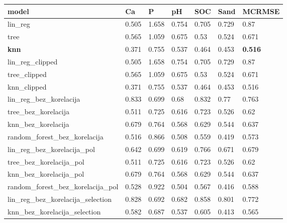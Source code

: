 \documentclass[12pt]{article}
\begin{document}
\begin{table}[!ht]
    \centering
    \begin{tabular}{|l|l|l|l|l|l|l|}
    \hline
        model & Ca & P & pH & SOC & Sand & MCRMSE \\ \hline
        lin\_reg & 0.505 & 1.658 & 0.754 & 0.705 & 0.729 & 0.87 \\ \hline
        tree & 0.565 & 1.059 & 0.675 & 0.53 & 0.524 & 0.671 \\ \hline
		\textbf{knn} & 0.371 & 0.755 & 0.537 & 0.464 & 0.453 & \textbf{0.516} \\ \hline
        lin\_reg\_clipped & 0.505 & 1.658 & 0.754 & 0.705 & 0.729 & 0.87 \\ \hline
        tree\_clipped & 0.565 & 1.059 & 0.675 & 0.53 & 0.524 & 0.671 \\ \hline
        knn\_clipped & 0.371 & 0.755 & 0.537 & 0.464 & 0.453 & 0.516 \\ \hline
        lin\_reg\_bez\_korelacija & 0.833 & 0.699 & 0.68 & 0.832 & 0.77 & 0.763 \\ \hline
        tree\_bez\_korelacija & 0.511 & 0.725 & 0.616 & 0.723 & 0.526 & 0.62 \\ \hline
        knn\_bez\_korelacija & 0.679 & 0.764 & 0.568 & 0.629 & 0.544 & 0.637 \\ \hline
        random\_forest\_bez\_korelacija & 0.516 & 0.866 & 0.508 & 0.559 & 0.419 & 0.573 \\ \hline
        lin\_reg\_bez\_korelacija\_pol & 0.642 & 0.699 & 0.619 & 0.766 & 0.671 & 0.679 \\ \hline
        tree\_bez\_korelacija\_pol & 0.511 & 0.725 & 0.616 & 0.723 & 0.526 & 0.62 \\ \hline
        knn\_bez\_korelacija\_pol & 0.679 & 0.764 & 0.568 & 0.629 & 0.544 & 0.637 \\ \hline
        random\_forest\_bez\_korelacija\_pol & 0.528 & 0.922 & 0.504 & 0.567 & 0.416 & 0.588 \\ \hline
        lin\_reg\_bez\_korelacija\_selection & 0.828 & 0.692 & 0.682 & 0.858 & 0.801 & 0.772 \\ \hline
        knn\_bez\_korelacija\_selection & 0.582 & 0.687 & 0.537 & 0.605 & 0.413 & 0.565 \\ \hline
    \end{tabular}
\end{table}


\pagebreak
\end{document}
